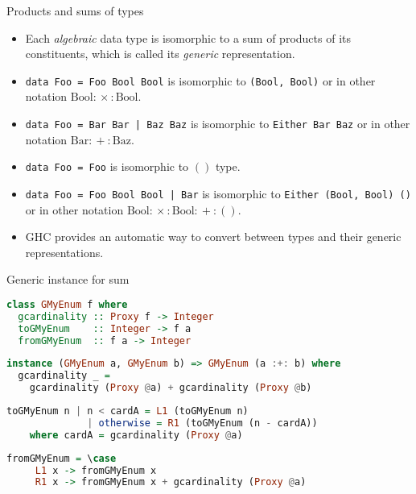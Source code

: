 \documentclass[handout]{beamer}
\begin{document}
\begin{frame}{Products and sums of types}

\begin{itemize}[<+->]

\item Each {\em algebraic} data type is isomorphic to a sum of products of
its constituents, which is called its {\em generic} representation.

\item
{\tt data Foo = Foo Bool Bool} is isomorphic to {\tt (Bool, Bool)}
or in other notation $ \text{Bool} {{}:}{\times}{:{}} \text{Bool} $.

\item
{\tt data Foo = Bar Bar | Baz Baz} is isomorphic to {\tt Either Bar Baz}
or in other notation $ \text{Bar} {{}:}{+}{:{}} \text{Baz} $.

\item
{\tt data Foo = Foo} is isomorphic to $()$ type.

\item
{\tt data Foo = Foo Bool Bool | Bar} is isomorphic to
{\tt Either (Bool, Bool) ()} or in other notation $ \text{Bool} {{}:}{\times}{:{}} \text{Bool} {{}:}{+}{:{}} () $.

\item
GHC provides an automatic way to convert between types
and their generic representations.

\end{itemize}

\end{frame}

\begin{frame}[fragile]{Generic instance for sum}

\begin{lstlisting}[language=Haskell]
class GMyEnum f where
  gcardinality :: Proxy f -> Integer
  toGMyEnum    :: Integer -> f a
  fromGMyEnum  :: f a -> Integer
\end{lstlisting} \pause
\begin{lstlisting}[language=Haskell]
instance (GMyEnum a, GMyEnum b) => GMyEnum (a :+: b) where
  gcardinality _ =
    gcardinality (Proxy @a) + gcardinality (Proxy @b)
\end{lstlisting} \pause
\begin{lstlisting}[language=Haskell]
  toGMyEnum n | n < cardA = L1 (toGMyEnum n)
              | otherwise = R1 (toGMyEnum (n - cardA))
    where cardA = gcardinality (Proxy @a)
\end{lstlisting} \pause
\begin{lstlisting}[language=Haskell]
  fromGMyEnum = \case
     L1 x -> fromGMyEnum x
     R1 x -> fromGMyEnum x + gcardinality (Proxy @a)
\end{lstlisting}

\end{frame}
\end{document}
